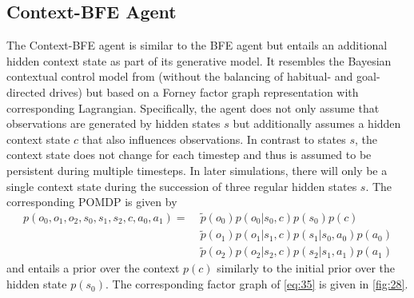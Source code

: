 \begin{algorithm}[htbp]
\end{algorithm}


\subsection{Context-BFE Agent}
\label{sec:context-bfe}

The Context-BFE agent is similar to the BFE agent but entails an additional hidden context state as part of its generative model. It resembles the Bayesian contextual control model from \textcite{schwoebel2021} (without the balancing of habitual- and goal-directed drives) but based on a Forney factor graph representation with corresponding Lagrangian. Specifically, the agent does not only assume that observations are generated by hidden states \(s\) but additionally assumes a hidden context state \(c\) that also influences observations. In contrast to states \(s\), the context state does not change for each timestep and thus is assumed to be persistent during multiple timesteps. In later simulations, there will only be a single context state during the succession of three regular hidden states \(s\). The corresponding POMDP is given by
\begin{equation}
    \begin{split}
        p(o_0, o_1, o_2, s_0, s_1, s_2, c, a_0, a_1) = \; & \tilde{p}(o_0) p(o_0|s_0,c) p(s_0) p(c)           \\
                                                          & \tilde{p}(o_1) p(o_1|s_1,c) p(s_1|s_0,a_0) p(a_0) \\
                                                          & \tilde{p}(o_2) p(o_2|s_2,c) p(s_2|s_1,a_1) p(a_1)
        \label{eq:35}
    \end{split}
\end{equation}
and entails a prior over the context \(p(c)\) similarly to the initial prior over the hidden state \(p(s_0)\). The corresponding factor graph of \cref{eq:35} is given in \cref{fig:28}.

